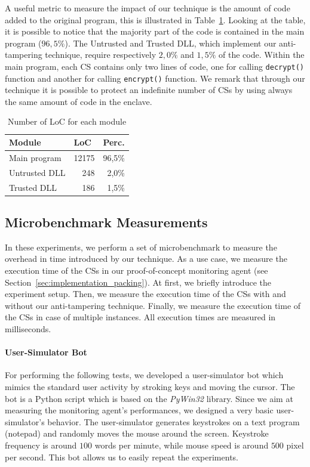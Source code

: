 A useful metric to measure the impact of our technique is the amount of code 
added to the original program, this is illustrated in Table~\ref{tbl:loc-stats}.
Looking at the table, it is possible to notice that the majority part of the 
code is contained in the main program ($96,5\%$).
The Untrusted and Trusted DLL, which implement our anti-tampering technique, 
require respectively $2,0\%$ and $1,5\%$ of the code.
Within the main program, each CS contains only two lines of code, one for 
calling \texttt{decrypt()} function and another for calling \texttt{encrypt()} 
function.
We remark that through our technique it is possible to protect an indefinite 
number of CSs by using always the same amount of code in the enclave.
~
\begin{table}[h]
	\center
	\caption{Number of LoC for each module}
	\label{tbl:loc-stats}
	\begin{tabular}{lrr}
		\toprule
		Module & \multicolumn{1}{l}{LoC} & \multicolumn{1}{l}{Perc.} \\
		\midrule
		Main program & 12175 & 96,5\% \\
		Untrusted DLL & 248 & 2,0\% \\
		Trusted DLL & 186 & 1,5\% \\
		\bottomrule
	\end{tabular}
\end{table}

\subsection{Microbenchmark Measurements}
In these experiments, we perform a set of microbenchmark to measure the 
overhead in time introduced by our technique.
As a use case, we measure the execution time of the CSs in our proof-of-concept 
monitoring agent (see Section~\ref{sec:implementation_packing}).
At first, we briefly introduce the experiment setup.
Then, we measure the execution time of the CSs with and without our 
anti-tampering technique.
Finally, we measure the execution time of the CSs in case of multiple instances.
All execution times are measured in milliseconds.

\paragraph{\textbf{User-Simulator Bot}}
For performing the following tests, we developed a user-simulator bot which 
mimics the standard user activity by stroking keys and moving the cursor.
The bot is a Python script which is based on the \emph{PyWin32} library. %
Since we aim at measuring the monitoring agent's performances, we designed a 
very basic user-simulator's behavior.
The user-simulator generates keystrokes on a text program (\ie notepad) and 
randomly moves the mouse around the screen.
Keystroke frequency is around $100$ words per minute, while mouse speed is 
around $500$ pixel per second.
This bot allows us to easily repeat the experiments.

